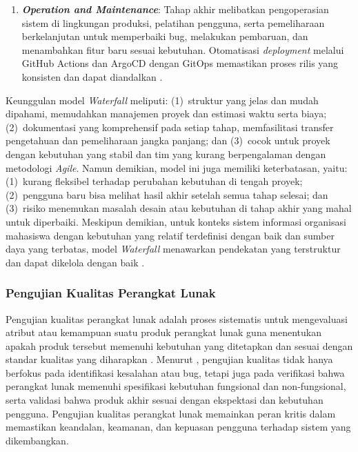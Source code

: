 \begin{enumerate}
  \item \textbf{\textit{Operation and Maintenance}}: Tahap akhir melibatkan pengoperasian sistem di lingkungan produksi, pelatihan pengguna, serta pemeliharaan berkelanjutan untuk memperbaiki bug, melakukan pembaruan, dan menambahkan fitur baru sesuai kebutuhan. Otomatisasi \textit{deployment} melalui GitHub Actions dan ArgoCD dengan GitOps memastikan proses rilis yang konsisten dan dapat diandalkan \citep{Ebert_2016_DevOps}.
\end{enumerate}

Keunggulan model \textit{Waterfall} meliputi: (1)~struktur yang jelas dan mudah dipahami, memudahkan manajemen proyek dan estimasi waktu serta biaya; (2)~dokumentasi yang komprehensif pada setiap tahap, memfasilitasi transfer pengetahuan dan pemeliharaan jangka panjang; dan (3)~cocok untuk proyek dengan kebutuhan yang stabil dan tim yang kurang berpengalaman dengan metodologi \textit{Agile}. Namun demikian, model ini juga memiliki keterbatasan, yaitu: (1)~kurang fleksibel terhadap perubahan kebutuhan di tengah proyek; (2)~pengguna baru bisa melihat hasil akhir setelah semua tahap selesai; dan (3)~risiko menemukan masalah desain atau kebutuhan di tahap akhir yang mahal untuk diperbaiki. Meskipun demikian, untuk konteks sistem informasi organisasi mahasiswa dengan kebutuhan yang relatif terdefinisi dengan baik dan sumber daya yang terbatas, model \textit{Waterfall} menawarkan pendekatan yang terstruktur dan dapat dikelola dengan baik \citep{Petersen_2015_WaterfallAgile, Akinsola_2020_SDLC}.

\subsubsection{Pengujian Kualitas Perangkat Lunak}

Pengujian kualitas perangkat lunak adalah proses sistematis untuk mengevaluasi atribut atau kemampuan suatu produk perangkat lunak guna menentukan apakah produk tersebut memenuhi kebutuhan yang ditetapkan dan sesuai dengan standar kualitas yang diharapkan \citep{Alyahya_2020_CrowdsourcedTestingSLR}. Menurut \citet{Pressman_2014_SE}, pengujian kualitas tidak hanya berfokus pada identifikasi kesalahan atau bug, tetapi juga pada verifikasi bahwa perangkat lunak memenuhi spesifikasi kebutuhan fungsional dan non-fungsional, serta validasi bahwa produk akhir sesuai dengan ekspektasi dan kebutuhan pengguna. Pengujian kualitas perangkat lunak memainkan peran kritis dalam memastikan keandalan, keamanan, dan kepuasan pengguna terhadap sistem yang dikembangkan.

